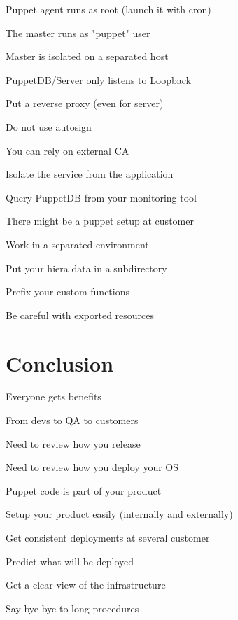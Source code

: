 \begin{iframe}[Security]
\item Puppet agent runs as root (launch it with cron)
\item The master runs as "puppet" user
\item Master is isolated on a separated host
\item PuppetDB/Server only listens to Loopback
\item Put a reverse proxy (even for server)
\end{iframe}

\begin{iframe}
\item Do not use autosign
\item You can rely on external CA
\item Isolate the service from the application
\item Query PuppetDB from your monitoring tool
\end{iframe}



\begin{iframe}
\item There might be a puppet setup at customer
\item Work in a separated environment
\item Put your hiera data in a subdirectory
\item Prefix your custom functions
\item Be careful with exported resources
\end{iframe}

\section{Conclusion}


\begin{iframe}
\item Everyone gets benefits
\item From devs to QA to customers
\item Need to review how you release
\item Need to review how you deploy your OS
\item Puppet code is part of your product
\end{iframe}

\begin{iframe}[Advantages]
\item Setup your product easily (internally and externally)
\item Get consistent deployments at several customer
\item Predict what will be deployed
\item Get a clear view of the infrastructure
\item Say bye bye to long procedures
\end{iframe}

